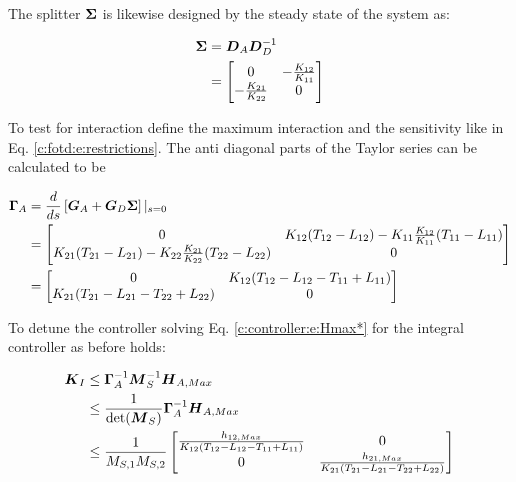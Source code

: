 The splitter $\mbox{\boldmath$\Sigma$}$ is likewise designed by the steady state of the system as:

\begin{align}
\begin{split}
\mbox{\boldmath$\Sigma$} &= \mbox{\boldmath$D$}_A\mbox{\boldmath$D$}_D^{-1} \\
& = \begin{bmatrix}
0 & -\frac{K_{12}}{K_{11}} \\
-\frac{K_{21}}{K_{22}} & 0
\end{bmatrix}
\end{split}
\end{align}

To test for interaction define the maximum interaction and the sensitivity like in Eq. \ref{c:fotd:e:restrictions}. The anti diagonal parts of the Taylor series can be calculated to be

\begin{align}
\begin{split}
\mbox{\boldmath$\Gamma$}_A &= \frac{d}{ds}\left[\mbox{\boldmath$G$}_A + \mbox{\boldmath$G$}_D\mbox{\boldmath$\Sigma$}\right]|_{s=0} \\
&= \begin{bmatrix}
0 & K_{12}(T_{12}-L_{12}) - K_{11}\frac{K_{12}}{K_{11}}(T_{11}-L_{11}) \\
K_{21}(T_{21}-L_{21}) - K_{22}\frac{K_{21}}{K_{22}}(T_{22}-L_{22}) & 0 
\end{bmatrix} \\
&= \begin{bmatrix}
0 & K_{12}(T_{12}-L_{12} - T_{11}+L_{11}) \\
K_{21}(T_{21}-L_{21} - T_{22}+L_{22}) & 0 
\end{bmatrix} 
\end{split}
\end{align}

To detune the controller solving Eq. \ref{c:controller:e:Hmax*} for the integral controller as before holds:

\begin{align}
\begin{split}
\mbox{\boldmath$K$}_I &\leq \mbox{\boldmath$\Gamma$}_A^{-1} \mbox{\boldmath$M$}_S^{-1} \mbox{\boldmath$H$}_{A,Max} \\
&\leq \frac{1}{\det(\mbox{\boldmath$M$}_S)} \mbox{\boldmath$\Gamma$}_A^{-1} \mbox{\boldmath$H$}_{A,Max} \\
&\leq \frac{1}{M_{S,1}M_{S,2}}\begin{bmatrix}
\frac{h_{12,Max}}{K_{12}(T_{12}-L_{12}-T_{11}+L_{11})} & 0 \\
0 &\frac{h_{21,Max}}{K_{21}(T_{21}-L_{21}-T_{22}+L_{22})}
\end{bmatrix}
\end{split}
\end{align}

